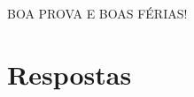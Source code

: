 \documentclass[12pt,a4paper]{article}
\begin{document}
\vfill
\begin{center}
BOA PROVA E BOAS FÉRIAS!
\end{center}

\newpage
\restoregeometry
\section*{Respostas}
\shipoutAnswer
\end{document}
